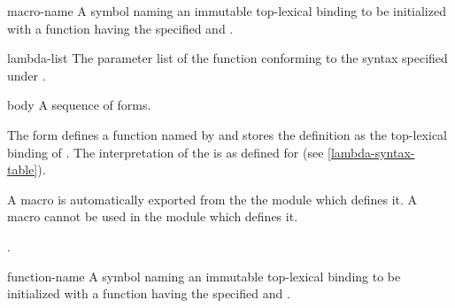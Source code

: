 \begin{optDefinition}
%
\Syntax
{}%
%
\begin{arguments}
    \item[macro-name] A symbol naming an immutable top-lexical binding to be
    initialized with a function having the specified  and
    .

    \item[lambda-list] The parameter list of the function conforming to the
    syntax specified under .

    \item[body] A sequence of forms.
\end{arguments}
%
\remarks%
The  form defines a function  named by
 and stores the definition as the top-lexical binding of
 
.  The interpretation of the 
is as defined for  (see \ref{lambda-syntax-table}).
%
\begin{note}
    A macro is automatically exported from the the module which defines it.  A
    macro cannot be used in the module which defines it.
\end{note}
%
\seealso%
.

%
\Syntax
{}%
%
\begin{arguments}
    \item[function-name] A symbol naming an immutable top-lexical binding to be
    initialized with a function having the specified  and
    .


\end{arguments}
\end{optDefinition}
